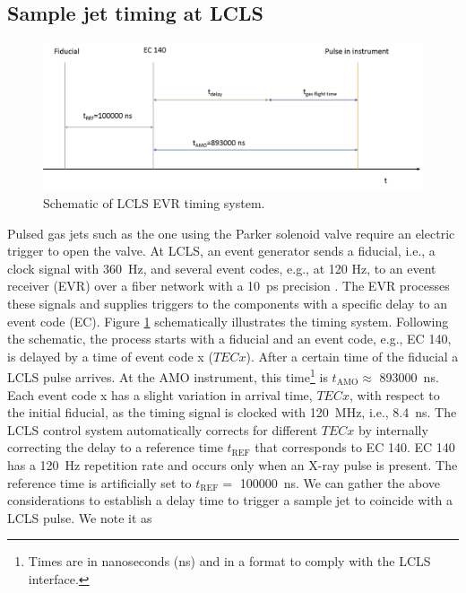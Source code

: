 \subsection{Sample jet timing at LCLS}\label{sec:jet-timing}
\begin{figure}
	\centering
		\includegraphics[width=1.00\textwidth]{images/LCLS-timing-schematic.png}
	\caption{Schematic of LCLS EVR timing system.}
	\label{fig:LCLS-EVR-timing}
\end{figure}
Pulsed gas jets such as the one using the Parker solenoid valve require an electric trigger to open the valve. At LCLS, an event generator sends a fiducial, i.e., a clock signal with \SI{360}{\hertz}, and several event codes, e.g., at 120 Hz, to an event receiver (EVR) over a fiber network with a \SI{10}{\pico\second} precision \citep{Krejcik-2007-DIPAC}. The EVR processes these signals and supplies triggers to the components with a specific delay to an event code (EC). Figure \ref{fig:LCLS-EVR-timing} schematically illustrates the timing system. Following the schematic, the process starts with a fiducial and an event code, e.g., EC 140, is delayed by a time of event code x ($TECx$). After a certain time of the fiducial a LCLS pulse arrives. At the AMO instrument, this time\footnote{Times are in nanoseconds (ns) and in a format to comply with the LCLS interface.} is $t_{\text{AMO}}\approx$ \SI{893000}{\nano\second}. Each event code x has a slight variation in arrival time, $TECx$, with respect to the initial fiducial, as the timing signal is clocked with \SI{120}{\mega\hertz}, i.e., \SI{8.4}{\nano\second}. The LCLS control system automatically corrects for different $TECx$ by internally correcting the delay to a reference time $t_{\text{REF}}$ that corresponds to EC 140. EC 140 has a \SI{120}{\hertz} repetition rate and occurs only when an X-ray pulse is present. The reference time is artificially set to $t_{\text{REF}}=$ \SI{100000}{\nano\second}. We can gather the above considerations to establish a delay time to trigger a sample jet to coincide with a LCLS pulse. We note it as
